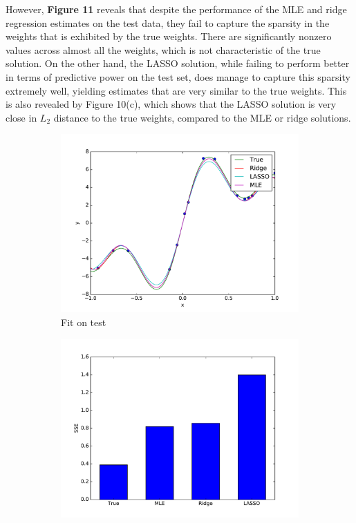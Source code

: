 \documentclass[10pt,psamsfonts]{amsart}
\theoremstyle{definition}
\theoremstyle{remark}
\numberwithin{equation}{section}
\begin{document}
However, {\bf Figure 11} reveals that despite the performance of the MLE and ridge regression estimates on the test data, they fail to capture the sparsity in the weights that is exhibited by the true weights. There are significantly nonzero values across almost all the weights, which is not characteristic of the true solution. On the other hand, the LASSO solution, while failing to perform better in terms of predictive power on the test set, does manage to capture this sparsity extremely well, yielding estimates that are very similar to the true weights. This is also revealed by Figure 10(c), which shows that the LASSO solution is very close in $L_2$ distance to the true weights, compared to the MLE or ridge solutions.

\begin{figure}
	\centering
	\begin{subfigure}[b]{0.25\textwidth}
		\includegraphics[width=\textwidth]{hw1_4-1.pdf}
		\caption{Fit on test}
	\end{subfigure}
	\begin{subfigure}[b]{0.25\textwidth}
		\includegraphics[width=\textwidth]{hw1_4-1_2.pdf}

\end{subfigure}
\end{figure}
\end{document}
